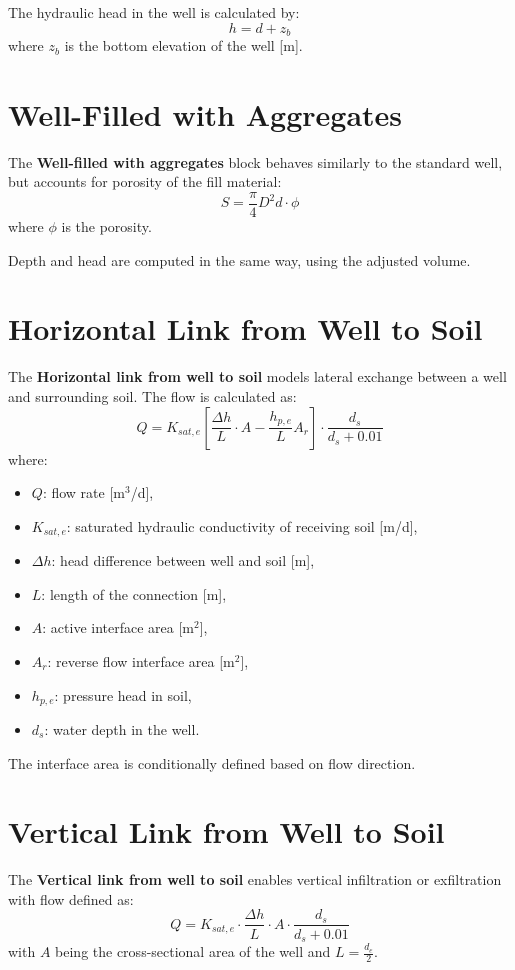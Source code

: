 \documentclass[12pt]{report}
\begin{document}
The hydraulic head in the well is calculated by:
\begin{equation}
h = d + z_b
\end{equation}
where $z_b$ is the bottom elevation of the well [m].

\section{Well-Filled with Aggregates}
The \textbf{Well-filled with aggregates} block behaves similarly to the standard well, but accounts for porosity of the fill material:
\begin{equation}
S = \frac{\pi}{4} D^2 d \cdot \phi
\end{equation}
where $\phi$ is the porosity.

Depth and head are computed in the same way, using the adjusted volume.

\section{Horizontal Link from Well to Soil}
The \textbf{Horizontal link from well to soil} models lateral exchange between a well and surrounding soil. The flow is calculated as:
\begin{equation}
Q = K_{sat,e} \left[ \frac{\Delta h}{L} \cdot A - \frac{h_{p,e}}{L} A_r \right] \cdot \frac{d_s}{d_s + 0.01}
\end{equation}
where:
\begin{itemize}
\item $Q$: flow rate [m$^3$/d],
\item $K_{sat,e}$: saturated hydraulic conductivity of receiving soil [m/d],
\item $\Delta h$: head difference between well and soil [m],
\item $L$: length of the connection [m],
\item $A$: active interface area [m$^2$],
\item $A_r$: reverse flow interface area [m$^2$],
\item $h_{p,e}$: pressure head in soil,
\item $d_s$: water depth in the well.
\end{itemize}

The interface area is conditionally defined based on flow direction.

\section{Vertical Link from Well to Soil}
The \textbf{Vertical link from well to soil} enables vertical infiltration or exfiltration with flow defined as:
\begin{equation}
Q = K_{sat,e} \cdot \frac{\Delta h}{L} \cdot A \cdot \frac{d_s}{d_s + 0.01}
\end{equation}
with $A$ being the cross-sectional area of the well and $L = \frac{d_e}{2}$.
\end{document}
